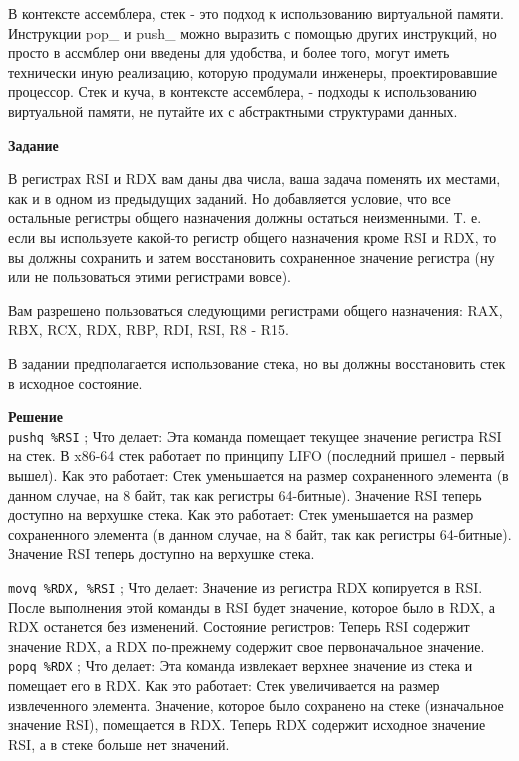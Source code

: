 	\par В контексте ассемблера, стек - это подход к использованию виртуальной памяти. Инструкции pop\_ и  push\_  можно выразить с помощью других инструкций, но просто в ассмблер они введены для удобства, и более того, могут иметь технически иную реализацию, которую продумали инженеры, проектировавшие процессор. Стек и куча, в контексте ассемблера, - подходы к использованию виртуальной памяти, не путайте их с абстрактными структурами данных.
	
	\par \textbf{Задание}
	
	\par В регистрах RSI и RDX вам даны два числа, ваша задача поменять их местами, как и в одном из предыдущих заданий. Но добавляется условие, что все остальные регистры общего назначения должны остаться неизменными. Т. е. если вы используете какой-то регистр общего назначения кроме RSI и RDX, то вы должны сохранить и затем восстановить сохраненное значение регистра (ну или не пользоваться этими регистрами вовсе).
	
	\par Вам разрешено пользоваться следующими регистрами общего назначения: RAX, RBX, RCX, RDX, RBP, RDI, RSI, R8 - R15.
	
	\par В задании предполагается использование стека, но вы должны восстановить стек в исходное состояние.
	
	\par \textbf{Решение}
    \\
	\texttt{pushq \%RSI} ; 
	Что делает: Эта команда помещает текущее значение регистра RSI на стек. В x86-64 стек работает по принципу LIFO (последний пришел - первый вышел). Как это работает: Стек уменьшается на размер сохраненного элемента (в данном случае, на 8 байт, так как регистры 64-битные). Значение RSI теперь доступно на верхушке стека. Как это работает: Стек уменьшается на размер сохраненного элемента (в данном случае, на 8 байт, так как регистры 64-битные). Значение RSI теперь доступно на верхушке стека.
	
 
    \par \texttt{movq \%RDX, \%RSI} ; Что делает: Значение из регистра RDX копируется в RSI. После выполнения этой команды в RSI будет значение, которое было в RDX, а RDX останется без изменений. Состояние регистров: Теперь RSI содержит значение RDX, а RDX по-прежнему содержит свое первоначальное значение.
	\\
	\texttt{popq \%RDX} ; Что делает: Эта команда извлекает верхнее значение из стека и помещает его в RDX. Как это работает: Стек увеличивается на размер извлеченного элемента. Значение, которое было сохранено на стеке (изначальное значение RSI), помещается в RDX. Теперь RDX содержит исходное значение RSI, а в стеке больше нет значений.
	

